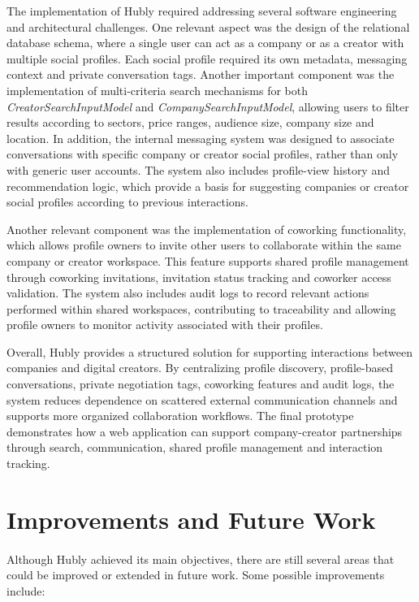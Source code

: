 The implementation of Hubly required addressing several software engineering and architectural challenges. One relevant aspect was the design of the relational database schema, where a single user can act as a company or as a creator with multiple social profiles. Each social profile required its own metadata, messaging context and private conversation tags. Another important component was the implementation of multi-criteria search mechanisms for both \emph{CreatorSearchInputModel} and \emph{CompanySearchInputModel}, allowing users to filter results according to sectors, price ranges, audience size, company size and location. In addition, the internal messaging system was designed to associate conversations with specific company or creator social profiles, rather than only with generic user accounts. The system also includes profile-view history and recommendation logic, which provide a basis for suggesting companies or creator social profiles according to previous interactions.

Another relevant component was the implementation of coworking functionality, which allows profile owners to invite other users to collaborate within the same company or creator workspace. This feature supports shared profile management through coworking invitations, invitation status tracking and coworker access validation. The system also includes audit logs to record relevant actions performed within shared workspaces, contributing to traceability and allowing profile owners to monitor activity associated with their profiles.

Overall, Hubly provides a structured solution for supporting interactions between companies and digital creators. By centralizing profile discovery, profile-based conversations, private negotiation tags, coworking features and audit logs, the system reduces dependence on scattered external communication channels and supports more organized collaboration workflows. The final prototype demonstrates how a web application can support company-creator partnerships through search, communication, shared profile management and interaction tracking.

\section{Improvements and Future Work}

\paragraph{}Although Hubly achieved its main objectives, there are still several areas that could be improved or extended in future work. Some possible improvements include:

